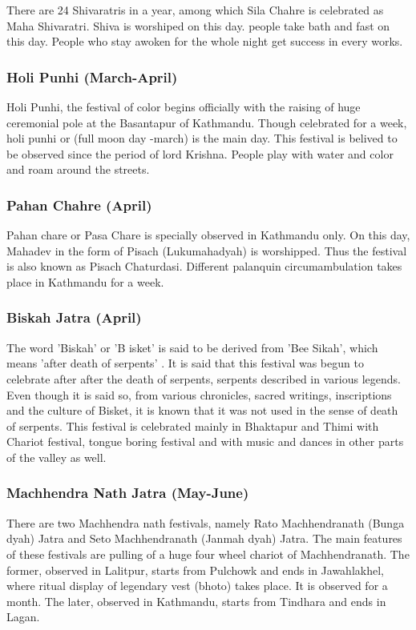 \documentclass[a4paper,13pt, margin=0.9in]{article}
\begin{document}
\begin{flushleft}
There are 24 Shivaratris in a year, among which Sila Chahre is celebrated as Maha Shivaratri. Shiva is worshiped on this day. people take bath and fast on this day. People who stay awoken for the whole night get success in every works.

\subsubsection{Holi Punhi (March-April)}

Holi Punhi, the festival of color begins officially with the raising of huge ceremonial pole at the Basantapur of Kathmandu. Though celebrated for a week, holi punhi or (full moon day -march) is the main day. This festival is belived to be observed since the period of lord Krishna. People play with water and color and roam around the streets.

\subsubsection{Pahan Chahre (April)}

Pahan chare or Pasa Chare is specially observed in Kathmandu only. On this day, Mahadev in the form of Pisach (Lukumahadyah) is worshipped. Thus the festival is also known as Pisach Chaturdasi. Different palanquin circumambulation takes place in Kathmandu for a week.

\subsubsection{Biskah Jatra (April)}

The word 'Biskah' or 'B isket' is said to be derived from 'Bee Sikah', which means 'after death of serpents' . It is said that this festival was begun to celebrate after after the death of serpents, serpents described in various legends. Even though it is said so, from various chronicles, sacred writings, inscriptions and the culture of Bisket, it is known that it was not used in the sense of death of serpents. This festival is celebrated mainly in Bhaktapur and Thimi with Chariot festival, tongue boring festival and with music and dances in other parts of the valley as well.

\subsubsection{Machhendra Nath Jatra (May-June)}

There are two Machhendra nath festivals, namely Rato Machhendranath (Bunga dyah) Jatra and Seto Machhendranath (Janmah dyah) Jatra. The main features of these festivals are pulling of a huge four wheel chariot of Machhendranath. The former, observed in Lalitpur, starts from Pulchowk and ends in Jawahlakhel, where ritual display of legendary vest (bhoto) takes place. It is observed for a month. The later, observed in Kathmandu, starts from Tindhara and ends in Lagan.


\end{flushleft}
\end{document}
